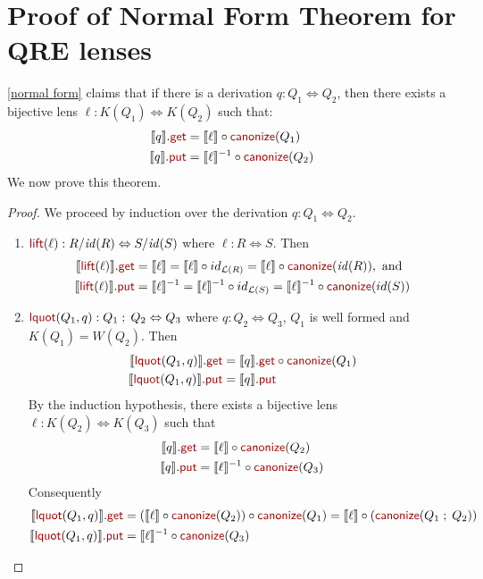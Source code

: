 \documentclass[acmsmall,review,anonymous]{acmart}
\newcommand{\kw}[1]{\textcolor{dkred}{\ensuremath{\mathsf{#1}}}}
\newcommand{\canonize}{\ensuremath{\kw{canonize}}}
\newcommand{\get}{\ensuremath{\kw{get}}}
\newcommand{\lput}{\ensuremath{\kw{put}}}
\newcommand{\lquot}{\ensuremath{\kw{lquot}}}
\begin{document}
\section{Proof of Normal Form Theorem for QRE lenses}
\cref{normal form} claims that if there is a derivation $q : Q_1
\Leftrightarrow Q_2$, then there exists a bijective lens $\ell : K(Q_1)
\Leftrightarrow K(Q_2)$ such that:
\begin{align*}
\llbracket q \rrbracket.\get &= \llbracket \ell \rrbracket\circ
\canonize(Q_1)\\
\llbracket q \rrbracket.\lput &= \llbracket \ell \rrbracket^{-1} \circ
\canonize(Q_2)
\end{align*}
We now prove this theorem.
\begin{proof}
We proceed by induction over the derivation $q : Q_1 \Leftrightarrow Q_2$.
\begin{enumerate}
  \item
  $\kw{lift}(\ell): R/\mathit{id}(R) \Leftrightarrow S/\mathit{id}(S)$ where
  $\ell : R \Leftrightarrow S$. Then
  \begin{align*}
\llbracket \kw{lift}(\ell) \rrbracket.\get &=  \llbracket \ell \rrbracket
= \llbracket \ell \rrbracket \circ id_{\mathcal{L}(R)} =
\llbracket \ell \rrbracket \circ \canonize(\mathit{id}(R)), \text{ and }\\
\llbracket \kw{lift}(\ell) \rrbracket.\lput &= \llbracket \ell
\rrbracket^{-1} = \llbracket \ell \rrbracket^{-1} \circ id_{\mathcal{L}(S)} =
\llbracket \ell \rrbracket^{-1} \circ \canonize(id(S))
\end{align*}
\item
$\lquot(Q_1, q): Q_1 \; ; \; Q_2 \Leftrightarrow Q_3$ where $q : Q_2
\Leftrightarrow Q_3$, $Q_1$ is well formed and $K(Q_1) = W(Q_2)$. Then
\begin{align*}
\llbracket \lquot(Q_1, q) \rrbracket.\get  &= \llbracket q
\rrbracket.\get \circ \canonize(Q_1)\\
\llbracket \lquot(Q_1, q) \rrbracket.\lput &= \llbracket q \rrbracket.\lput
\end{align*}
By the induction hypothesis, there exists a bijective lens $\ell :
K(Q_2) \Leftrightarrow K(Q_3)$ such that
\begin{align*}
\llbracket q \rrbracket.\get &= \llbracket \ell \rrbracket \circ
\canonize(Q_2)\\
\llbracket q \rrbracket.\lput &= \llbracket \ell \rrbracket^{-1} \circ
\canonize(Q_3)
\end{align*}
Consequently
\begin{align*}
\llbracket \lquot(Q_1, q)\rrbracket.\get  &= (\llbracket \ell \rrbracket \circ
\canonize(Q_2)) \circ \canonize(Q_1) = \llbracket \ell \rrbracket \circ
(\canonize(Q_1 \; ; \; Q_2))\\
\llbracket \lquot(Q_1, q) \rrbracket.\lput &= \llbracket \ell \rrbracket^{-1} \circ
\canonize(Q_3)
\end{align*}


\end{enumerate}
\end{proof}
\end{document}
